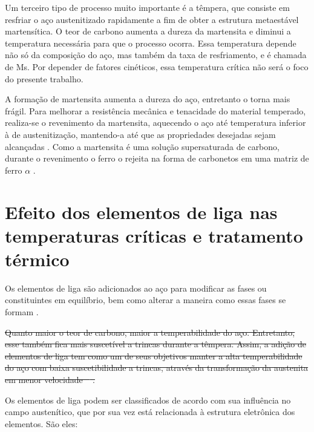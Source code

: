 \documentclass[brazil,tf,epusp]{usp}  %
\providecommand{\DIFdel}[1]{{\protect\color{red}\sout{#1}}}                      %
\providecommand{\DIFaddbegin}{} %
\providecommand{\DIFdelbegin}{} %
\providecommand{\DIFdelend}{} %
\begin{document}
Um terceiro tipo de processo muito importante é a têmpera, que consiste em resfriar o aço austenitizado rapidamente a fim de obter a estrutura metaestável martensítica. O teor de carbono aumenta a dureza da martensita e diminui a temperatura necessária para que o processo ocorra. Essa temperatura depende não só da composição do aço, mas também da taxa de resfriamento, e é chamada de Ms. Por depender de fatores cinéticos, essa temperatura crítica não será o foco do presente trabalho.

A formação de martensita aumenta a dureza do aço, entretanto o torna mais frágil. Para  melhorar a resistência mecânica e tenacidade do material temperado, realiza-se o revenimento da martensita, aquecendo o aço até temperatura inferior à de austenitização, mantendo-a até que as propriedades desejadas sejam alcançadas \cite{Silva2010}. Como a martensita é uma solução supersaturada de carbono, durante o revenimento o ferro o rejeita na forma de carbonetos em uma matriz de ferro $\alpha$ \cite{Honeycombe1982}.

\section{Efeito dos elementos de liga nas temperaturas críticas e tratamento térmico}
Os elementos de liga são adicionados ao aço para modificar as fases ou constituintes em equilíbrio, bem como alterar a maneira como essas fases se formam \cite{Silva2010}.

\DIFdelbegin \DIFdel{Quanto maior o teor de carbono, maior a temperabilidade do aço. Entretanto, esse também fica mais suscetível a trincas durante a têmpera. Assim, a adição de elementos de liga tem como um de seus objetivos manter a alta temperabilidade do aço com baixa suscetibilidade a trincas, através da transformação da austenita em menor velocidade \mbox{%
\cite{Souza1989}}%
.
}\DIFdelend %

Os elementos de liga podem ser classificados de acordo com sua influência no campo austenítico, que por sua vez está relacionada à estrutura eletrônica dos elementos. São eles:
\DIFaddbegin 
\end{document}
